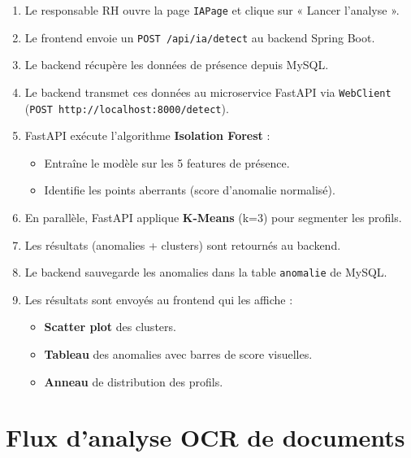 \documentclass[a4paper,12pt]{report}
\begin{document}
\begin{enumerate}
  \item Le responsable RH ouvre la page \texttt{IAPage} et clique sur « Lancer l'analyse ».
  \item Le frontend envoie un \texttt{POST /api/ia/detect} au backend Spring Boot.
  \item Le backend récupère les données de présence depuis MySQL.
  \item Le backend transmet ces données au microservice FastAPI via \texttt{WebClient} (\texttt{POST http://localhost:8000/detect}).
  \item FastAPI exécute l'algorithme \textbf{Isolation Forest} :
  \begin{itemize}
    \item Entraîne le modèle sur les 5 features de présence.
    \item Identifie les points aberrants (score d'anomalie normalisé).
  \end{itemize}
  \item En parallèle, FastAPI applique \textbf{K-Means} (k=3) pour segmenter les profils.
  \item Les résultats (anomalies + clusters) sont retournés au backend.
  \item Le backend sauvegarde les anomalies dans la table \texttt{anomalie} de MySQL.
  \item Les résultats sont envoyés au frontend qui les affiche :
  \begin{itemize}
    \item \textbf{Scatter plot} des clusters.
    \item \textbf{Tableau} des anomalies avec barres de score visuelles.
    \item \textbf{Anneau} de distribution des profils.
  \end{itemize}
\end{enumerate}

\section{Flux d'analyse OCR de documents}
\end{document}
